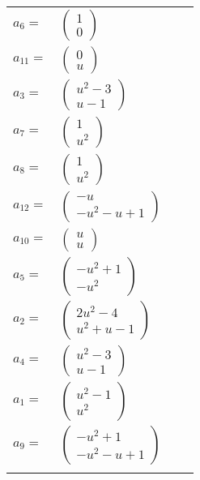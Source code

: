 \documentclass[1p]{elsarticle_modified}
\theoremstyle{definition}
\begin{document}
\begin{tabular}{m{7pt} m{180pt} m{7pt} m{180pt} }
\flushright $a_{6}=$&$\begin{pmatrix}1\\0\end{pmatrix}$ \\
\flushright $a_{11}=$&$\begin{pmatrix}0\\u\end{pmatrix}$ \\
\flushright $a_{3}=$&$\begin{pmatrix}u^2-3\\u-1\end{pmatrix}$ \\
\flushright $a_{7}=$&$\begin{pmatrix}1\\u^2\end{pmatrix}$ \\
\flushright $a_{8}=$&$\begin{pmatrix}1\\u^2\end{pmatrix}$ \\
\flushright $a_{12}=$&$\begin{pmatrix}- u\\- u^2- u+1\end{pmatrix}$ \\
\flushright $a_{10}=$&$\begin{pmatrix}u\\u\end{pmatrix}$ \\
\flushright $a_{5}=$&$\begin{pmatrix}- u^2+1\\- u^2\end{pmatrix}$ \\
\flushright $a_{2}=$&$\begin{pmatrix}2 u^2-4\\u^2+u-1\end{pmatrix}$ \\
\flushright $a_{4}=$&$\begin{pmatrix}u^2-3\\u-1\end{pmatrix}$ \\
\flushright $a_{1}=$&$\begin{pmatrix}u^2-1\\u^2\end{pmatrix}$ \\
\flushright $a_{9}=$&$\begin{pmatrix}- u^2+1\\- u^2- u+1\end{pmatrix}$\\&\end{tabular}
\end{document}
